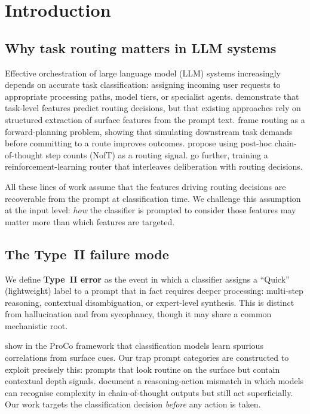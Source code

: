 \documentclass[11pt,a4paper]{article}
\begin{document}
\section{Introduction}
\label{sec:intro}

\subsection{Why task routing matters in LLM systems}
\label{sec:intro:routing}

Effective orchestration of large language model (LLM) systems increasingly
depends on accurate task classification: assigning incoming user requests
to appropriate processing paths, model tiers, or specialist agents.
\citet{Agrawal2025} demonstrate that task-level features predict routing
decisions, but that existing approaches rely on structured extraction of
surface features from the prompt text.  \citet{Huang2025} frame routing
as a forward-planning problem, showing that simulating downstream task
demands before committing to a route improves outcomes.  \citet{MarinelliPichlmeier2025}
propose using post-hoc chain-of-thought step counts (NofT) as a routing
signal.  \citet{ZhangRouterR12025} go further, training a reinforcement-learning
router that interleaves deliberation with routing decisions.

All these lines of work assume that the features driving routing decisions
are recoverable from the prompt at classification time.  We challenge this
assumption at the input level: \emph{how} the classifier is prompted to
consider those features may matter more than which features are targeted.

\subsection{The Type~II failure mode}
\label{sec:intro:type2}

We define \textbf{Type~II error} as the event in which a classifier assigns
a ``Quick'' (lightweight) label to a prompt that in fact requires deeper
processing: multi-step reasoning, contextual disambiguation, or expert-level
synthesis.  This is distinct from hallucination and from sycophancy,
though it may share a common mechanistic root.

\citet{Wu2024} show in the ProCo framework that classification models
learn spurious correlations from surface cues.  Our trap prompt categories
are constructed to exploit precisely this: prompts that look routine on
the surface but contain contextual depth signals.  \citet{MASFT2025}
document a reasoning-action mismatch in which models can recognise
complexity in chain-of-thought outputs but still act superficially.
Our work targets the classification decision \emph{before} any action
is taken.
\end{document}
